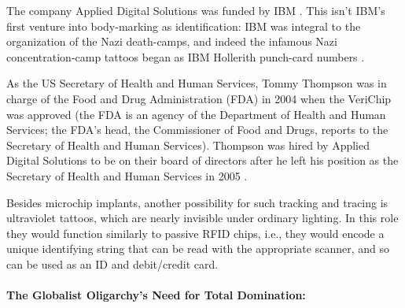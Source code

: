 \documentclass[letterpaper,12pt]{article}
\begin{document}
The company Applied Digital Solutions was funded by IBM \cite{BusinessWire2003}. This isn't IBM's first venture into body-marking as identification: IBM was integral to the organization of the Nazi death-camps, and indeed the infamous Nazi concentration-camp tattoos began as IBM Hollerith punch-card numbers \cite{Black2001,Black2002-03,Black2002-10}.

As the US Secretary of Health and Human Services, Tommy Thompson was in charge of the Food and Drug Administration (FDA) in 2004 when the VeriChip was approved (the FDA is an agency of the Department of Health and Human Services; the FDA's head, the Commissioner of Food and Drugs, reports to the Secretary of Health and Human Services). Thompson was hired by Applied Digital Solutions to be on their board of directors after he left his position as the Secretary of Health and Human Services in 2005 \cite{Lewan2007}.

Besides microchip implants, another possibility for such tracking and tracing is ultraviolet tattoos, which are nearly invisible under ordinary lighting. In this role they would function similarly to passive RFID chips, i.e., they would encode a unique identifying string that can be read with the appropriate scanner, and so can be used as an ID and debit\slash credit card.

\paragraph{The Globalist Oligarchy's Need for Total Domination:}
\label{parag:GlobalistOligarchyNeedTotalDomination}
\end{document}
